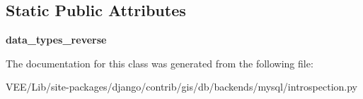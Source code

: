 \subsection*{Static Public Attributes}
\begin{DoxyCompactItemize}
\item 
\mbox{\label{classdjango_1_1contrib_1_1gis_1_1db_1_1backends_1_1mysql_1_1introspection_1_1_my_s_q_l_introspection_a4ae1ddcdcb743897556e51cf76ebd459}} 
{\bfseries data\+\_\+types\+\_\+reverse}
\end{DoxyCompactItemize}


The documentation for this class was generated from the following file\+:\begin{DoxyCompactItemize}
\item 
V\+E\+E/\+Lib/site-\/packages/django/contrib/gis/db/backends/mysql/introspection.\+py\end{DoxyCompactItemize}
